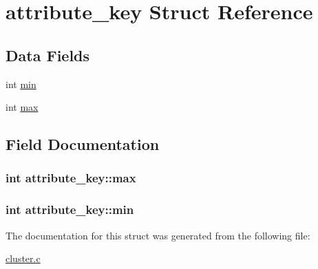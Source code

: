 \hypertarget{structattribute__key}{
\section{attribute\_\-key Struct Reference}
\label{structattribute__key}
}
\subsection*{Data Fields}
\begin{DoxyCompactItemize}
\item 
int \hyperlink{structattribute__key_a4fdb3d7aabeac6b1052b59e05e3d8842}{min}
\item 
int \hyperlink{structattribute__key_a82b7e5ac49820b816871a4ddf30c462d}{max}
\end{DoxyCompactItemize}


\subsection{Field Documentation}
\hypertarget{structattribute__key_a82b7e5ac49820b816871a4ddf30c462d}{
\subsubsection[{max}]{\setlength{\rightskip}{0pt plus 5cm}int {\bf attribute\_\-key::max}}}
\label{structattribute__key_a82b7e5ac49820b816871a4ddf30c462d}
\hypertarget{structattribute__key_a4fdb3d7aabeac6b1052b59e05e3d8842}{
\subsubsection[{min}]{\setlength{\rightskip}{0pt plus 5cm}int {\bf attribute\_\-key::min}}}
\label{structattribute__key_a4fdb3d7aabeac6b1052b59e05e3d8842}


The documentation for this struct was generated from the following file:\begin{DoxyCompactItemize}
\item 
\hyperlink{cluster_8c}{cluster.c}\end{DoxyCompactItemize}

